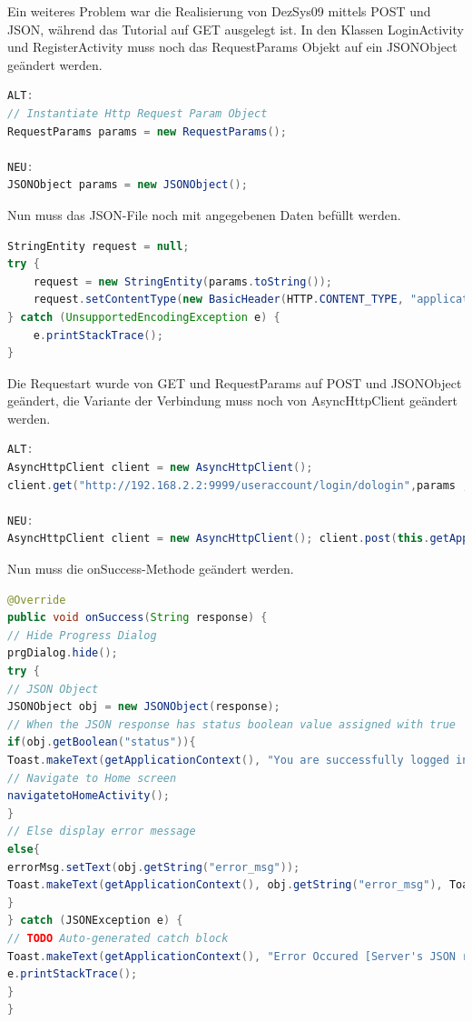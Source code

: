 Ein weiteres Problem war die Realisierung von DezSys09 mittels POST und JSON, während das Tutorial auf GET ausgelegt ist. In den Klassen LoginActivity und RegisterActivity muss noch das RequestParams Objekt auf ein JSONObject geändert werden.
\clearpage

\begin{lstlisting}[frame=single, language=java, caption=Ändern des RequestParams Objekts auf ein JSONObject]
ALT:
// Instantiate Http Request Param Object
RequestParams params = new RequestParams();

NEU:
JSONObject params = new JSONObject();
\end{lstlisting}

Nun muss das JSON-File noch mit angegebenen Daten befüllt werden.
\begin{lstlisting}[frame=single, language=java, caption=Ändern des RequestParams Objekts auf ein JSONObject]
StringEntity request = null;
try {
	request = new StringEntity(params.toString());
	request.setContentType(new BasicHeader(HTTP.CONTENT_TYPE, "application/json"));
} catch (UnsupportedEncodingException e) {
	e.printStackTrace();
}
\end{lstlisting}

Die Requestart wurde von GET und RequestParams auf POST und JSONObject geändert, die Variante der Verbindung muss noch von AsyncHttpClient geändert werden.

\begin{lstlisting}[frame=single, language=java, caption=Ändern des AsyncHttpClients]
ALT:
AsyncHttpClient client = new AsyncHttpClient();
client.get("http://192.168.2.2:9999/useraccount/login/dologin",params ,new AsyncHttpResponseHandler()

NEU:
AsyncHttpClient client = new AsyncHttpClient(); client.post(this.getApplicationContext(), "http://10.0.2.2:8080/register", request, "application/json", new TextHttpResponseHandler() {
\end{lstlisting}

Nun muss die onSuccess-Methode geändert werden.
\begin{lstlisting}[frame=single, language=java, caption=onSuccess Methode]
@Override
public void onSuccess(String response) {
// Hide Progress Dialog
prgDialog.hide();
try {
// JSON Object
JSONObject obj = new JSONObject(response);
// When the JSON response has status boolean value assigned with true
if(obj.getBoolean("status")){
Toast.makeText(getApplicationContext(), "You are successfully logged in!", Toast.LENGTH_LONG).show();
// Navigate to Home screen
navigatetoHomeActivity();
}
// Else display error message
else{
errorMsg.setText(obj.getString("error_msg"));
Toast.makeText(getApplicationContext(), obj.getString("error_msg"), Toast.LENGTH_LONG).show();
}
} catch (JSONException e) {
// TODO Auto-generated catch block
Toast.makeText(getApplicationContext(), "Error Occured [Server's JSON response might be invalid]!", Toast.LENGTH_LONG).show();
e.printStackTrace();
}
}
\end{lstlisting}
\clearpage

